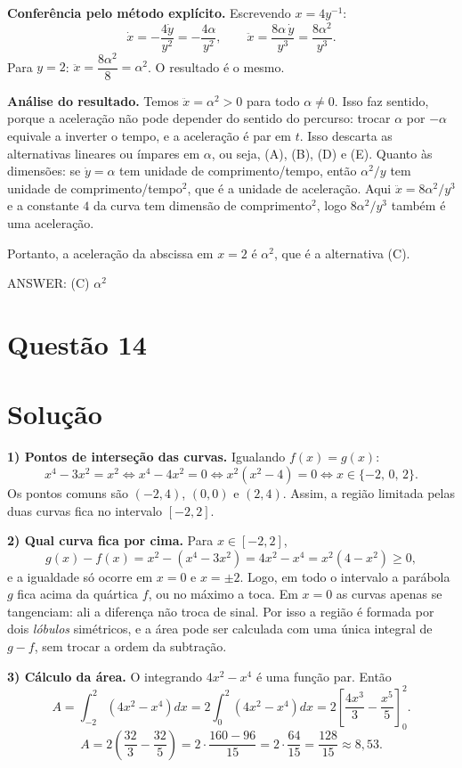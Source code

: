 \documentclass{article}%
\begin{document}
\textbf{Conferência pelo método explícito.} Escrevendo $x=4y^{-1}$:
\[
\dot x=-\frac{4\dot y}{y^2}=-\frac{4\alpha}{y^2},\qquad
\ddot x=\frac{8\alpha\,\dot y}{y^3}=\frac{8\alpha^2}{y^3}.
\]
Para $y=2$: $\ddot x=\dfrac{8\alpha^2}{8}=\alpha^2$. O resultado é o mesmo.

\textbf{Análise do resultado.} Temos $\ddot x=\alpha^2>0$ para todo $\alpha\neq 0$. Isso faz sentido, porque a aceleração não pode depender do sentido do percurso: trocar $\alpha$ por $-\alpha$ equivale a inverter o tempo, e a aceleração é par em $t$. Isso descarta as alternativas lineares ou ímpares em $\alpha$, ou seja, (A), (B), (D) e (E). Quanto às dimensões: se $\dot y=\alpha$ tem unidade de comprimento/tempo, então $\alpha^2/y$ tem unidade de comprimento/tempo$^2$, que é a unidade de aceleração. Aqui $\ddot x=8\alpha^2/y^3$ e a constante $4$ da curva tem dimensão de comprimento$^2$, logo $8\alpha^2/y^3$ também é uma aceleração.

Portanto, a aceleração da abscissa em $x=2$ é $\alpha^2$, que é a alternativa (C).

ANSWER: (C) $\alpha^2$%
\newpage%
\section*{Questão 14}

\section*{Solução}

\textbf{1) Pontos de interseção das curvas.} Igualando $f(x)=g(x)$:
\[
x^4-3x^2=x^2 \iff x^4-4x^2=0 \iff x^2(x^2-4)=0 \iff x\in\{-2,\,0,\,2\}.
\]
Os pontos comuns são $(-2,4)$, $(0,0)$ e $(2,4)$. Assim, a região limitada pelas duas curvas fica no intervalo $[-2,2]$.

\textbf{2) Qual curva fica por cima.} Para $x\in[-2,2]$,
\[
g(x)-f(x)=x^2-(x^4-3x^2)=4x^2-x^4=x^2(4-x^2)\ge 0,
\]
e a igualdade só ocorre em $x=0$ e $x=\pm 2$. Logo, em todo o intervalo a parábola $g$ fica acima da quártica $f$, ou no máximo a toca. Em $x=0$ as curvas apenas se tangenciam: ali a diferença não troca de sinal. Por isso a região é formada por dois \textit{lóbulos} simétricos, e a área pode ser calculada com uma única integral de $g-f$, sem trocar a ordem da subtração.

\textbf{3) Cálculo da área.} O integrando $4x^2-x^4$ é uma função par. Então
\[
A=\int_{-2}^{2}\left(4x^2-x^4\right)dx
=2\int_{0}^{2}\left(4x^2-x^4\right)dx
=2\left[\frac{4x^3}{3}-\frac{x^5}{5}\right]_{0}^{2}.
\]
\[
A=2\left(\frac{32}{3}-\frac{32}{5}\right)
=2\cdot\frac{160-96}{15}
=2\cdot\frac{64}{15}
=\frac{128}{15}\approx 8{,}53 .
\]
\end{document}
